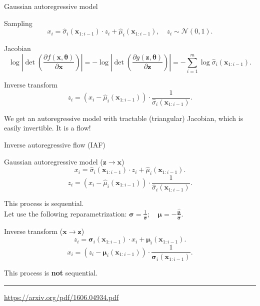 \documentclass{beamer}
\newcommand{\bx}{\mathbf{x}}
\newcommand{\bz}{\mathbf{z}}
\newcommand{\bmu}{\boldsymbol{\mu}}
\newcommand{\bsigma}{\boldsymbol{\sigma}}
\newcommand{\btheta}{\boldsymbol{\theta}}
\begin{document}
\begin{frame}{Gaussian autoregressive model}
	\begin{block}{Sampling}
		\vspace{-0.5cm}
		\[
		x_i = \hat{\sigma}_i (\bx_{1:i-1}) \cdot z_i + \hat{\mu}_i(\bx_{1:i-1}), \quad z_i \sim \mathcal{N}(0, 1).
		\]
		\vspace{-0.5cm}
	\end{block}
	\begin{block}{Jacobian}
		\vspace{-0.5cm}
		\[
		\log \left|\det \left( \frac{\partial f(\bx, \btheta)}{\partial \bx} \right) \right| = -\log \left|\det \left( \frac{\partial g(\bz, \btheta)}{\partial \bz} \right) \right| = - \sum_{i = 1}^m \log \hat{\sigma}_i (\bx_{1:i-1}).
		\]
		\vspace{-0.5cm}
	\end{block} 
	\begin{block}{Inverse transform}
		\vspace{-0.5cm}
		\[
		z_i = \left(x_i - \hat{\mu}_i(\bx_{1:i-1}) \right) \cdot \frac{1}{\hat{\sigma}_i (\bx_{1:i-1}) }.
		\]
	\end{block}
	We get an autoregressive model with tractable (triangular) Jacobian, which is easily invertible. It is a flow!
\end{frame}
\begin{frame}{Inverse autoregressive flow (IAF)}
	
	\begin{block}{Gaussian autoregressive model ($\bz \rightarrow \bx$)}
		\vspace{-0.2cm}
		\[
			x_i = \hat{\sigma}_i (\bx_{1:i-1}) \cdot z_i + \hat{\mu}_i(\bx_{1:i-1}).
		\]
		\[
			z_i = \left(x_i - \hat{\mu}_i(\bx_{1:i-1}) \right) \cdot \frac{1}{ \hat{\sigma}_i (\bx_{1:i-1})}.
		\]
		\vspace{-0.3cm}
	\end{block}
	This process is sequential. \\
	Let use the following reparametrization:
	$\bsigma = \frac{1}{\hat{\bsigma}}; \quad \bmu = - \frac{\hat{\bmu}}{\hat{\bsigma}}.$
	
	\begin{block}{Inverse transform ($\bx \rightarrow \bz$)}
		\vspace{-0.2cm}
		\[
			z_i = \bsigma_i (\bx_{1:i-1}) \cdot x_i + \bmu_i(\bx_{1:i-1}).
		\]
		\[
			x_i = \left( z_i - \bmu_i(\bx_{1:i-1})\right) \cdot \frac{1}{\bsigma_i (\bx_{1:i-1}) }.
		\]
		\vspace{-0.3cm}
	\end{block}
	This process is \textbf{not} sequential.
	\vfill
	\hrule\medskip
	{\scriptsize \href{https://arxiv.org/pdf/1606.04934.pdf}{https://arxiv.org/pdf/1606.04934.pdf}} 
\end{frame}
\end{document}
